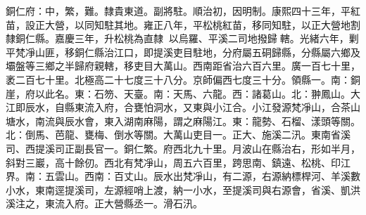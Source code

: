 \begin{pinyinscope}
銅仁府：中，繁，難。隸貴東道。副將駐。順治初，因明制。康熙四十三年，平紅苗，設正大營，以同知駐其地。雍正八年，平松桃紅苗，移同知駐，以正大營地割隸銅仁縣。嘉慶三年，升松桃為直隸，以烏羅、平溪二司地撥歸轄。光緒六年，剿平梵凈山匪，移銅仁縣治江口，即提溪吏目駐地，分府屬五硐歸縣，分縣屬六鄉及壩盤等三鄉之半歸府親轄，移吏目大萬山。西南距省治六百六里。廣一百七十里，袤二百七十里。北極高二十七度三十八分。京師偏西七度三十分。領縣一。南：銅崖，府以此名。東：石笏、天臺。南：天馬、六龍。西：諸葛山。北：翀鳳山。大江即辰水，自縣東流入府，合甕怕洞水，又東與小江合。小江發源梵凈山，合茶山塘水，南流與辰水會，東入湖南麻陽，謂之麻陽江。東：龍勢、石榴、漾頭等關。北：倒馬、芭龍、甕梅、倒水等關。大萬山吏目一。正大、施溪二汛。東南省溪司、西提溪司正副長官一。銅仁繁。府西北九十里。月波山在縣治右，形如半月，斜對三巖，高十餘仞。西北有梵凈山，周五六百里，跨思南、鎮遠、松桃、印江界。南：五雲山。西南：百丈山。辰水出梵凈山，有二源，右源納標桿河、羊溪數小水，東南逕提溪司，左源經哨上渡，納一小水，至提溪司與右源會，省溪、凱洪溪注之，東流入府。正大營縣丞一。滑石汛。


\end{pinyinscope}
